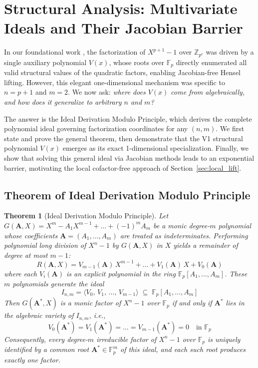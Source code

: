 \documentclass[12pt]{article}
\theoremstyle{plain}
\newtheorem{thm}{Theorem}
\begin{document}
\section{Structural Analysis: Multivariate Ideals and Their Jacobian Barrier}

In our foundational work \cite{Wang2026ISIT}, the factorization of $X^{p+1}-1$ over $\mathbb{Z}_{p^e}$ was driven by a single auxiliary polynomial $V(x)$, whose roots over $\mathbb{F}_p$ directly enumerated all valid structural values of the quadratic factors, enabling Jacobian-free Hensel lifting. However, this elegant one-dimensional mechanism was specific to $n=p+1$ and $m=2$. We now ask: \emph{where does $V(x)$ come from algebraically, and how does it generalize to arbitrary $n$ and $m$?}

The answer is the Ideal Derivation Modulo Principle, which derives the complete polynomial ideal governing factorization coordinates for any $(n, m)$. We first state and prove the general theorem, then demonstrate that the V1 structural polynomial $V(x)$ emerges as its exact 1-dimensional specialization. Finally, we show that solving this general ideal via Jacobian methods leads to an exponential barrier, motivating the local cofactor-free approach of Section~\ref{sec:local_lift}.

\subsection{Theorem of Ideal Derivation Modulo Principle}

\begin{thm}[Ideal Derivation Modulo Principle] \label{thm:ideal_modulo}
Let $G(\mathbf{A}, X) = X^m - A_1 X^{m-1} + \dots + (-1)^m A_m$ be a monic degree-$m$ polynomial whose coefficients $\mathbf{A} = (A_1, \dots, A_m)$ are treated as indeterminates. Performing polynomial long division of $X^n - 1$ by $G(\mathbf{A}, X)$ in $X$ yields a remainder of degree at most $m-1$:
\begin{equation}
    R(\mathbf{A}, X) = V_{m-1}(\mathbf{A})\, X^{m-1} + \dots + V_1(\mathbf{A})\, X + V_0(\mathbf{A})
\end{equation}
where each $V_i(\mathbf{A})$ is an explicit polynomial in the ring $\mathbb{F}_p[A_1, \dots, A_m]$. These $m$ polynomials generate the ideal
\begin{equation}
    I_{n,m} = \langle V_0, \, V_1, \, \dots, \, V_{m-1} \rangle \;\subseteq\; \mathbb{F}_p[A_1, \dots, A_m]
\end{equation}
Then $G(\mathbf{A}^*, X)$ is a monic factor of $X^n - 1$ over $\mathbb{F}_p$ if and only if $\mathbf{A}^*$ lies in the algebraic variety of $I_{n,m}$, i.e.,
\begin{equation}
    V_0(\mathbf{A}^*) = V_1(\mathbf{A}^*) = \dots = V_{m-1}(\mathbf{A}^*) = 0 \quad \text{in } \mathbb{F}_p
\end{equation}
Consequently, every degree-$m$ irreducible factor of $X^n-1$ over $\mathbb{F}_p$ is uniquely identified by a common root $\mathbf{A}^* \in \mathbb{F}_p^m$ of this ideal, and each such root produces exactly one factor.
\end{thm}
\end{document}
